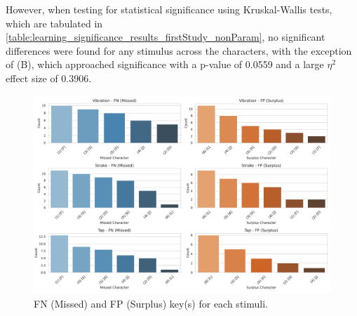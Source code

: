 However, when testing for statistical significance using Kruskal-Wallis tests, which are tabulated in \autoref{table:learning_significance_results_firstStudy_nonParam}, no significant differences were found for any stimulus across the characters, with the exception of (B), which approached significance with a p-value of 0.0559 and a large \(\eta^2\) effect size of 0.3906.
\begin{table}[ht]
\caption{Results of Kruskal-Wallis significance tests for the different Braille characters during testing with a $\eta^2$ Effect Size.}
\label{table:learning_significance_results_firstStudy_nonParam}
\end{table}





\begin{figure}
    \centering
    \includegraphics[width=\linewidth]{src/pictures/Study1Data_Experiment/missed_surplus_test_study1.pdf}
    \caption{FN  (Missed) and FP (Surplus) key(s) for each stimuli.}
    \label{fig:missedSurplus_study1}
\end{figure}

